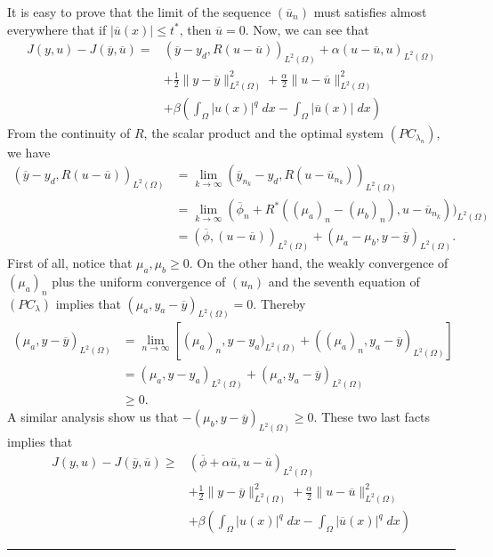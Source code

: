 \documentclass[11pt,a4paper]{amsart}
\newcommand{\kw}{\rule{2mm}{2mm}}
\newcommand{\om}{\Omega}
\renewenvironment{proof}{{Proof.}}{\hfill\kw}
\newcommand{\norm}[1]{\lVert #1 \rVert}
\begin{document}
\begin{proof}
   It is easy to prove that the limit of the sequence $(\overline{u}_n)$ must satisfies almost everywhere that if $|\overline{u}(x)|\le t^*$, then $\overline{u}=0$. Now, we can see that
    \begin{align*}
        J(y,u)-J(\overline{y},\overline{u})=&(\overline{y}-y_d, R(u-\overline{u}))_{L^2(\Omega)}+\alpha(u-\overline{u},u)_{L^2(\Omega)}\\
        &+\frac{1}{2}\norm{y-\overline{y}}_{L^2(\om)}^2+\frac{\alpha}{2}\norm{u-\overline{u}}_{L^2(\om)}^2\\
        &+\beta\left(\int_{\Omega}|u(x)|^q\; dx-\int_{\om}|\overline{u}(x)|\; dx\right)
    \end{align*}
    From the continuity of $R$, the scalar product and the optimal system $(PC_{\lambda_n})$, we have
    \begin{align*}
        (\overline{y}-y_d, R(u-\overline{u}))_{L^2(\Omega)}&=\lim_{k\to \infty}(\overline{y}_{n_k}-y_d, R(u-\overline{u}_{n_k}))_{L^2(\om)}\\
        &=\lim_{k\to \infty}(\overline{\phi}_{n}+R^*((\mu_{a})_n-(\mu_{b})_n), u-\overline{u}_{n_k}))_{L^2(\om)}\\
        &=(\overline{\phi},(u-\overline{u}))_{L^2(\om)}+(\mu_a-\mu_b,y-\overline{y})_{L^2(\om)}.
    \end{align*}
    First of all, notice that $\mu_a, \mu_b\ge 0$. On the other hand, the weakly convergence of $(\mu_a)_{n}$ plus the uniform convergence of $(u_{n})$ and the seventh equation of $(PC_{\lambda})$ implies that $(\mu_a,y_a-\overline{y})_{L^2(\om)}=0$. Thereby
    \begin{align*}
    (\mu_a,y-\overline{y})_{L^2(\om)}&=\lim_{n\to\infty}[(\mu_a)_{n},y-y_a)_{L^2(\om)}+((\mu_a)_{n},y_a-\overline{y})_{L^2(\om)}]\\
    &= (\mu_a,y-y_a)_{L^2(\om)}+(\mu_a,y_a-\overline{y})_{L^2(\om)}\\
    &\ge 0.
    \end{align*}
    A similar analysis show us that $-(\mu_b,y-\overline{y})_{L^2(\om)}\ge 0$. These two last facts implies that
     \begin{align*}
        J(y,u)-J(\overline{y},\overline{u})\ge&(\overline{\phi}+\alpha \overline{u},u-\overline{u})_{L^2(\Omega)}\\
        &+\frac{1}{2}\norm{y-\overline{y}}_{L^2(\om)}^2+\frac{\alpha}{2}\norm{u-\overline{u}}_{L^2(\om)}^2\\
        &+\beta\left(\int_{\Omega}|u(x)|^q\; dx-\int_{\om}|\overline{u}(x)|^q\; dx\right)

\end{align*}
\end{proof}
\end{document}
